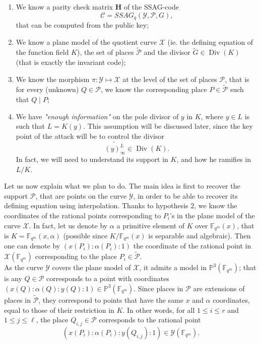 \documentclass[10pt]{article}
\newcommand{\s}{\vspace{0.3cm}}
\newcommand{\PP}{\mathbb{P}}
\newcommand{\fqm}{\mathbb{F}_{q^m}}
\newcommand{\X}{\mathcal{X}}
\newcommand{\Y}{\mathcal{Y}}
\newcommand{\PR}{\mathcal{P}}
\newcommand{\Div}{\operatorname{Div}}
\newcommand{\hugues}[1]{\textcolor{blue}{#1}}
\newcommand{\notehugues}[1]{\marginpar{\small\hugues{#1}}}
\begin{document}
\begin{enumerate}
\item We know a parity check matrix $\mathbf{H}$ of the SSAG-code  \[\mathcal{C} = SSAG_q(\Y,\PR,G),\]
that can be computed from the public key;
\item We know a plane model of the quotient curve $\X$ (ie. the defining equation of the function field $K$), the set of places $\tilde{\PR}$ and the divisor $\tilde{G} \in \Div(K)$ (that is exactly the invariant code);
\item We know the morphism $\pi : \Y \longmapsto \X$ at the level of the set of places $\PR$, that is for every (unknown) $Q \in \PR$, we know the corresponding place $P \in \tilde{\PR}$ such that $Q \mid P$;
\item We have \emph{"enough information"} on the pole divisor of $y$ in $K$, where $y \in L$ is such that $L=K(y)$. This assumption will be discussed later, since the key point of the attack will be to control the divisor 
\[\widetilde{(y)^L_{\infty}} \in \Div(K).\] 
In fact, we will need to understand its support in $K$, and how he ramifies in $L/K$.
\end{enumerate}
\s

Let us now explain what we plan to do. The main idea is first to recover the support $\PR$, that are points on the curve $\Y$, in order to be able to recover its defining equation using interpolation. Thanks to hypothesis $2$, we know the coordinates of the rational points corresponding to $P_i$'s in the plane model of the curve $\X$. In fact, let us denote by $\alpha$ a primitive element of $K$ over $\fqm(x)$, that is $K = \fqm(x,\alpha)$ (possible since $K/\fqm(x)$ is separable and algebraic). Then one can denote by $(x(P_i):\alpha(P_i):1)$ the coordinate of the rational point in $\X(\fqm)$ corresponding to the place $P_i \in \tilde{\PR}$. \\

As the curve $\Y$ covers the plane model of $\X$, it admits a model in $\PP^3(\fqm)$; that is any $Q \in \PR$ corresponds to a point with coordinates $(x(Q):\alpha(Q):y(Q):1) \in \PP^3(\fqm)$. Since places in $\PR$ are extensions of places in $\tilde{\PR}$, they correspond to points that have the same $x$ and $\alpha$ coordinates, equal to those of their restriction in $K$. In other words, for all $1 \leq i \leq r$ and $1 \leq j \leq \ell$, the place $Q_{i,j} \in \PR$ corresponds to the rational point
\[ (x(P_i):\alpha(P_i):y(Q_{i,j}):1) \in \Y(\fqm).\]
\end{document}
